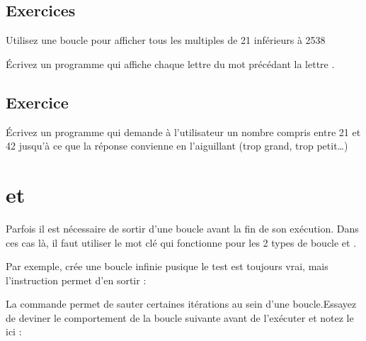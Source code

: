 \documentclass[letterpaper,10pt,english]{sphinxmanual}
\begin{document}
\subsection{Exercices}
\label{\detokenize{src/OCI04_Boucles:id1}}
Utilisez une boucle  pour afficher tous les multiples de 21 inférieurs à 2538

Écrivez un programme qui affiche chaque lettre du mot  précédant la lettre .


\subsection{Exercice}
\label{\detokenize{src/OCI04_Boucles:id2}}
Écrivez un programme qui demande à l’utilisateur un nombre compris entre 21 et 42 jusqu’à ce que la réponse convienne en l’aiguillant (trop grand, trop petit…)


\section{ et }
\label{\detokenize{src/OCI04_Boucles:break-et-continue}}
Parfois il est nécessaire de sortir d’une boucle avant la fin de son exécution.
Dans ces cas là, il faut utiliser le mot clé  qui fonctionne pour les 2 types de boucle  et .

Par exemple,  crée une boucle infinie pusique le test est toujours vrai, mais l’instruction  permet d’en sortir :

\begin{sphinxVerbatim}[commandchars=\\\{\}]
  
 
        
       
\end{sphinxVerbatim}

La commande  permet de sauter certaines itérations au sein d’une boucle.Essayez de deviner le comportement de la boucle suivante avant de l’exécuter et notez le ici :
\end{document}
